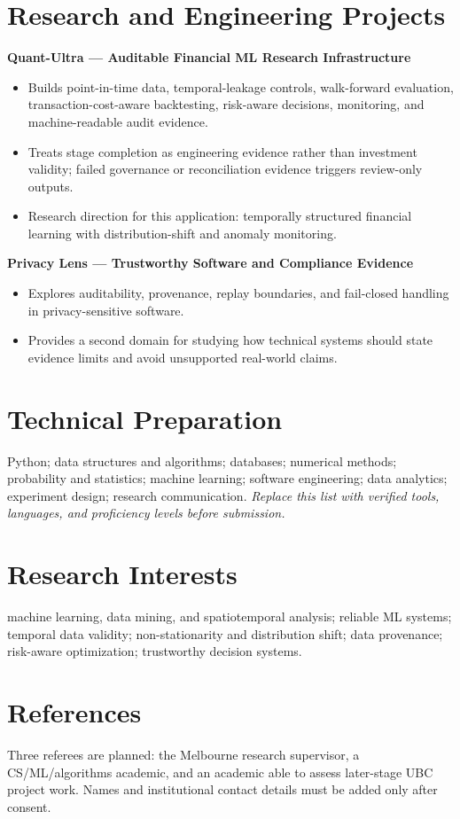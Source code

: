 \documentclass[11pt]{article}
\begin{document}
\section*{Research and Engineering Projects}
\textbf{Quant-Ultra --- Auditable Financial ML Research Infrastructure}
\begin{itemize}
\item Builds point-in-time data, temporal-leakage controls, walk-forward evaluation, transaction-cost-aware backtesting, risk-aware decisions, monitoring, and machine-readable audit evidence.
\item Treats stage completion as engineering evidence rather than investment validity; failed governance or reconciliation evidence triggers review-only outputs.
\item Research direction for this application: temporally structured financial learning with distribution-shift and anomaly monitoring.
\end{itemize}

\textbf{Privacy Lens --- Trustworthy Software and Compliance Evidence}
\begin{itemize}
\item Explores auditability, provenance, replay boundaries, and fail-closed handling in privacy-sensitive software.
\item Provides a second domain for studying how technical systems should state evidence limits and avoid unsupported real-world claims.
\end{itemize}

\section*{Technical Preparation}
Python; data structures and algorithms; databases; numerical methods; probability and statistics; machine learning; software engineering; data analytics; experiment design; research communication. \textit{Replace this list with verified tools, languages, and proficiency levels before submission.}

\section*{Research Interests}
machine learning, data mining, and spatiotemporal analysis; reliable ML systems; temporal data validity; non-stationarity and distribution shift; data provenance; risk-aware optimization; trustworthy decision systems.

\section*{References}
Three referees are planned: the Melbourne research supervisor, a CS/ML/algorithms academic, and an academic able to assess later-stage UBC project work. Names and institutional contact details must be added only after consent.
\end{document}
